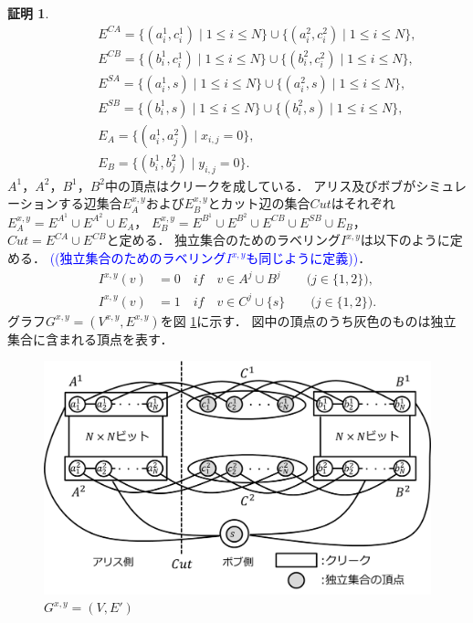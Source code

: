 \documentclass[12pt]{thesis}
\newcommand{\Izumi}[1]{\textcolor{blue}{(#1)}}
\theoremstyle{definition}
\newtheorem*{prf*}{証明}
\begin{document}
\begin{prf*}
\begin{align*}
&\phantom{=} \quad E^{CA} = \{(a^{1}_{i}, c^{1}_{i}) \mid 1\leq i \leq N\} \cup \{(a^{2}_{i}, c^{2}_{i}) \mid 1\leq i \leq N\}, \\
&\phantom{=} \quad E^{CB} = \{(b^{1}_{i}, c^{1}_{i}) \mid 1\leq i \leq N\} \cup \{(b^{2}_{i}, c^{2}_{i}) \mid 1\leq i \leq N\}, \\
&\phantom{=} \quad E^{SA} = \{(a^{1}_{i}, s) \mid 1\leq i \leq N\} \cup \{(a^{2}_{i}, s) \mid 1\leq i \leq N\}, \\
&\phantom{=} \quad E^{SB} = \{(b^{1}_{i}, s) \mid 1\leq i \leq N\} \cup \{(b^{2}_{i}, s) \mid 1\leq i \leq N\}, \\
&\phantom{=} \quad E_{A} = \{(a^{1}_{i},a^{2}_{j}) \mid x_{i,j}=0\}, \\
&\phantom{=} \quad E_{B} = \{(b^{1}_{i},b^{2}_{j}) \mid y_{i,j}=0\}.
\end{align*}
$A^{1}$，$A^{2}$，$B^{1}$，$B^{2}$中の頂点はクリークを成している．
アリス及びボブがシミュレーションする辺集合$E^{x,y}_A$および$E^{x,y}_B$とカット辺の集合$Cut$はそれぞれ
$E^{x,y}_{A} = E^{A^{1}} \cup E^{A^{2}} \cup E_{A}$，
$E^{x,y}_{B} = E^{B^{1}} \cup E^{B^{2}} \cup E^{CB} \cup E^{SB} \cup E_{B}$，
$Cut = E^{CA} \cup E^{CB}$と定める．
独立集合のためのラベリング$I^{x,y}$は以下のように定める．
\Izumi{(独立集合のためのラベリング$I^{x,y}$も同じように定義)}．
\begin{align*}
I^{x,y}(v) &= 0 \quad if \quad v \in A^{j} \cup B^{j} \quad \quad \text{($j \in \{1, 2\}$)}, \\
I^{x,y}(v) &= 1 \quad if \quad v \in C^{j} \cup \{s\} \quad \quad \text{($j \in \{1, 2\}$)}.
\end{align*}
グラフ$G^{x, y} = (V^{x,y}, E^{x,y})$を図 \ref{3_G(x,y)}に示す．
図中の頂点のうち灰色のものは独立集合に含まれる頂点を表す．

\begin{figure}[ht]
\begin{center}
\includegraphics[width=120mm]{3_Gxy.png}
\end{center}
\caption{$G^{x, y} = (V, E')$}
\label{3_G(x,y)}
\end{figure}


\end{prf*}
\end{document}
